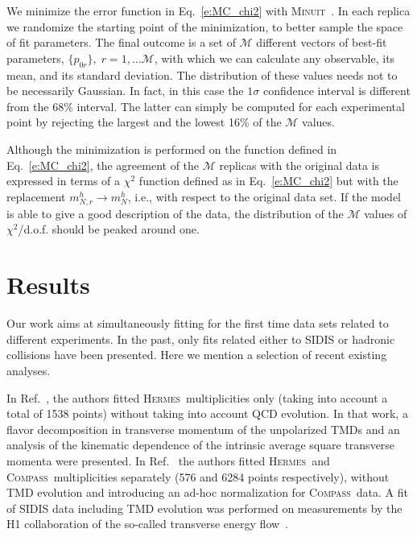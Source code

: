 \documentclass[aps,preprintnumbers,showpacs,nofootinbib,superscriptaddress,floatfix]{revtex4}
\newcommand{\hermes}{\textsc{Hermes}}
\newcommand{\compass}{\textsc{Compass}}
\newcommand{\minuit}{\textsc{Minuit}}
\begin{document}
We minimize the error function in
Eq.~\eqref{e:MC_chi2} with \minuit~\cite{James:1975dr}. 
In each replica we randomize the starting point of the minimization, to better
sample the space of fit parameters.
 The final outcome is a set of $\mathcal{M}$ different vectors of best-fit parameters, $\{ p_{0r}\},\; r=1,\ldots \mathcal{M}$, with which we can calculate any observable, its mean, and its standard deviation. 
The distribution of these values needs not to be necessarily Gaussian. In fact, in this case the $1 \sigma$ confidence interval is different from the 68\% interval. 
The latter can simply be computed for each experimental point by rejecting the largest and the lowest 16\% of the $\mathcal{M}$ values.   

Although the minimization is performed on the function defined in
Eq.~\eqref{e:MC_chi2}, the agreement of the $\mathcal{M}$ replicas with the
original data is expressed in terms of a $\chi^2$ function defined as in
Eq.~\eqref{e:MC_chi2} but with the replacement $m_{N, r}^{h} \to m_{N}^{h}$,
i.e.,  with respect to the original data set. If the model is able to give a
good description of the data, the distribution of the $\mathcal{M}$ values of
$\chi^2$/d.o.f. should be peaked around one.  














\section{Results}
\label{s:results}


Our work aims at simultaneously fitting for the first time data sets related to different experiments. 
In the past, only fits related either to SIDIS or hadronic collisions have
been presented. Here we mention a selection of recent existing analyses. 

In Ref.~\cite{Signori:2013mda}, the authors fitted \hermes\ multiplicities
only (taking into account a total of 1538 points) 
without taking into account QCD evolution. 
In that work, a flavor decomposition in transverse momentum of the unpolarized
TMDs and an analysis of the kinematic dependence of the intrinsic average
square transverse momenta were presented.  
In Ref.~\cite{Anselmino:2013lza} the authors fitted \hermes\ and \compass\
multiplicities separately (576 and 6284 points respectively), without TMD
evolution and introducing an
ad-hoc normalization for \compass\ data. A fit of
SIDIS data including TMD evolution was performed on measurements by the H1
collaboration of the so-called transverse energy flow~\cite{Nadolsky:1999kb,Aid:1995we}. 
 
\end{document}
